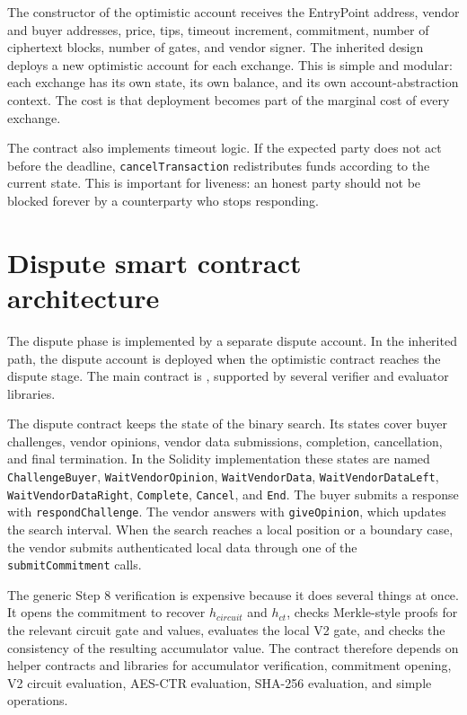 The constructor of the optimistic account receives the EntryPoint address, vendor and buyer
addresses, price, tips, timeout increment, commitment, number of ciphertext blocks, number of
gates, and vendor signer. The inherited design deploys a new optimistic account for each
exchange. This is simple and modular: each exchange has its own state, its own balance, and
its own account-abstraction context. The cost is that deployment becomes part of the marginal
cost of every exchange.

The contract also implements timeout logic. If the expected party does not act before the
deadline, \texttt{cancelTransaction} redistributes funds according to the current state. This
is important for liveness: an honest party should not be blocked forever by a counterparty
who stops responding.

\section{Dispute smart contract architecture}

The dispute phase is implemented by a separate dispute account. In the inherited path, the
dispute account is deployed when the optimistic contract reaches the dispute stage. The main
contract is , supported by several verifier and evaluator
libraries.

The dispute contract keeps the state of the binary search. Its states cover buyer
challenges, vendor opinions, vendor data submissions, completion, cancellation, and final
termination. In the Solidity implementation these states are named
\texttt{ChallengeBuyer}, \texttt{WaitVendorOpinion}, \texttt{WaitVendorData},
\texttt{WaitVendorDataLeft}, \texttt{WaitVendorDataRight}, \texttt{Complete},
\texttt{Cancel}, and \texttt{End}. The buyer submits a response with
\texttt{respondChallenge}. The vendor answers with \texttt{giveOpinion}, which updates the
search interval. When the search reaches a local position or a boundary case, the vendor
submits authenticated local data through one of the \texttt{submitCommitment} calls.

The generic Step 8 verification is expensive because it does several things at once. It
opens the commitment to recover \(h_{circuit}\) and \(h_{ct}\), checks Merkle-style proofs
for the relevant circuit gate and values, evaluates the local V2 gate, and checks the
consistency of the resulting accumulator value. The contract therefore depends on helper
contracts and libraries for accumulator verification, commitment opening, V2 circuit
evaluation, AES-CTR evaluation, SHA-256 evaluation, and simple operations.

